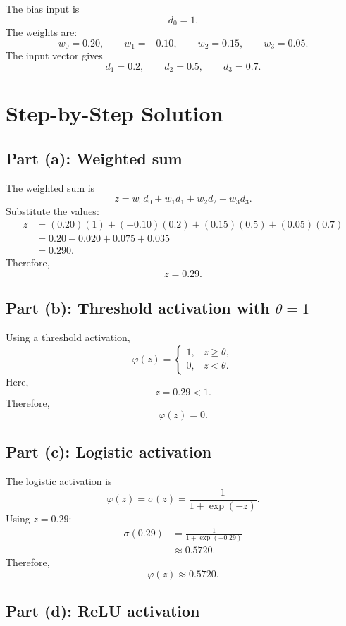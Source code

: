\documentclass[11pt]{article}
\begin{document}
The bias input is
\[
    d_0 = 1.
\]
The weights are:
\[
    w_0 = 0.20,\qquad
    w_1 = -0.10,\qquad
    w_2 = 0.15,\qquad
    w_3 = 0.05.
\]
The input vector gives
\[
    d_1=0.2,\qquad d_2=0.5,\qquad d_3=0.7.
\]

\section*{Step-by-Step Solution}

\subsection*{Part (a): Weighted sum}

The weighted sum is
\[
    z = w_0d_0+w_1d_1+w_2d_2+w_3d_3.
\]
Substitute the values:
\[
\begin{aligned}
    z
    &=
    (0.20)(1)+(-0.10)(0.2)+(0.15)(0.5)+(0.05)(0.7) \\
    &=
    0.20-0.020+0.075+0.035 \\
    &=
    0.290.
\end{aligned}
\]
Therefore,
\[
    \boxed{z=0.29}.
\]

\subsection*{Part (b): Threshold activation with \(\theta=1\)}

Using a threshold activation,
\[
    \varphi(z)
    =
    \begin{cases}
    1, & z\ge \theta, \\
    0, & z<\theta.
    \end{cases}
\]
Here,
\[
    z=0.29 < 1.
\]
Therefore,
\[
    \boxed{\varphi(z)=0}.
\]

\subsection*{Part (c): Logistic activation}

The logistic activation is
\[
    \varphi(z)=\sigma(z)=\frac{1}{1+\exp(-z)}.
\]
Using \(z=0.29\):
\[
\begin{aligned}
    \sigma(0.29)
    &=
    \frac{1}{1+\exp(-0.29)} \\
    &\approx
    0.5720.
\end{aligned}
\]
Therefore,
\[
    \boxed{\varphi(z)\approx 0.5720}.
\]

\subsection*{Part (d): ReLU activation}
\end{document}
